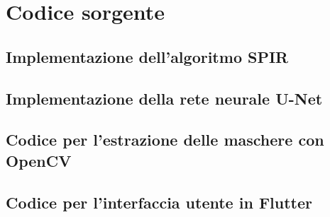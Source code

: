 \documentclass[a4paper,12pt]{report}
\begin{document}
\chapter{Codice sorgente}
  \section{Implementazione dell'algoritmo SPIR}
  \section{Implementazione della rete neurale U-Net}
  \section{Codice per l'estrazione delle maschere con OpenCV}
  \section{Codice per l'interfaccia utente in Flutter}



\end{document}
